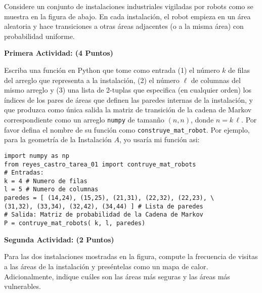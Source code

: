 \documentclass[ a4paper, twoside, 11pt]{article}
\begin{document}
\begin{problem}
Considere un conjunto de instalaciones industriales vigiladas por robots como se muestra en la figura de abajo. En cada instalaci\'on, el robot empieza en un \'area aleatoria y hace transiciones a otras \'areas adjacentes (o a la misma \'area) con probabilidad uniforme. 

\begin{figure}[htb]
\centering
\def\svgwidth{0.9\columnwidth}

\end{figure}

\textbf{Primera Actividad: (4 Puntos)}

Escriba una funci\'on en Python que tome como entrada (1) el n\'umero $k$ de filas del arreglo que representa a la instalaci\'on, (2) el n\'umero $\ell$ de columnas del mismo arreglo y (3) una lista de 2-tuplas que especifica (en cualquier orden) los \'indices de los pares de \'areas que definen las paredes internas de la instalaci\'on, y que produzca como \'unica salida la matriz de transici\'on de la cadena de Markov correspondiente como un arreglo {\tt numpy} de taman\~no $(n,n)$, donde $n = k \, \ell$. Por favor defina el nombre de su funci\'on como {\tt construye\_mat\_robot}. Por ejemplo, para la geometr\'ia de la Instalaci\'on $A$, yo usar\'ia mi funci\'on asi:
\halfskip

\begin{center}
\begin{minipage}{0.9\textwidth}
\begin{verbatim}
import numpy as np
from reyes_castro_tarea_01 import contruye_mat_robots
# Entradas:
k = 4 # Numero de filas
l = 5 # Numero de columnas
paredes = [ (14,24), (15,25), (21,31), (22,32), (22,23), \
(31,32), (33,34), (32,42), (34,44) ] # Lista de paredes
# Salida: Matriz de probabilidad de la Cadena de Markov
P = contruye_mat_robots( k, l, paredes)
\end{verbatim}
\end{minipage}
\end{center}
\fullskip

\textbf{Segunda Actividad: (2 Puntos)}

Para las dos instalaciones mostradas en la figura, compute la frecuencia de visitas a las \'areas de la instalaci\'on y pres\'entelas como un mapa de calor. Adicionalmente, indique cu\'ales son las \'areas m\'as seguras y las \'areas m\'as vulnerables. 


\end{problem}
\end{document}
